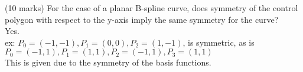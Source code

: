 (10 marks) For the case of a planar B-spline curve, does symmetry of the control polygon with respect to the y-axis imply the same symmetry for the curve? \\

Yes. \\

ex: $P_0 = (-1,-1), P_1 = (0,0) , P_2 = (1,-1)$, is symmetric, as is \\
$P_0 = (-1,1), P_1 = (1,1), P_2 = (-1,1), P_3 = (1,1)$  \\

This is given due to the symmetry of the basis functions.
